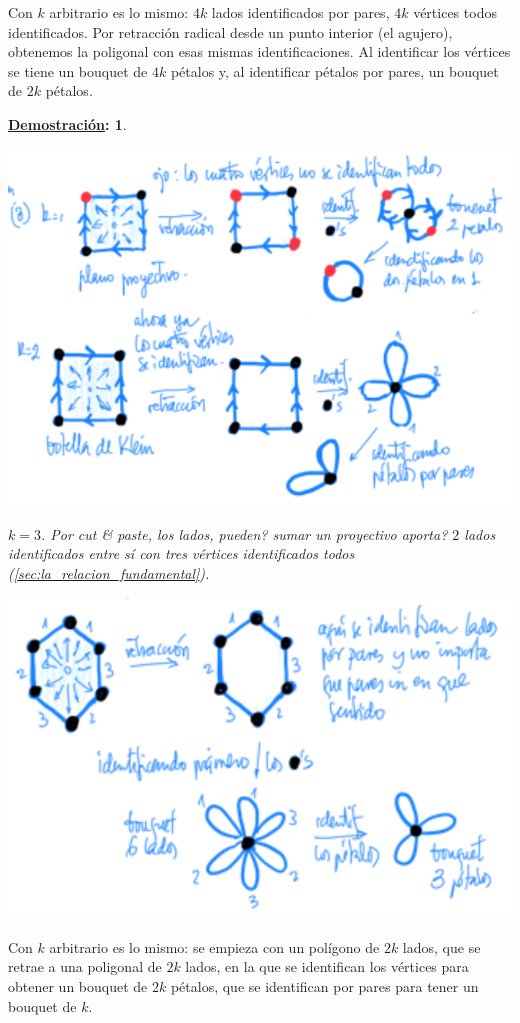 \documentclass[10pt,a4paper,openright]{book}
\theoremstyle{break}
\newtheorem*{demo}{\underline{Demostración}:}
\begin{document}
Con $k$ arbitrario es lo mismo: $4k$ lados identificados por pares, $4k$ vértices todos identificados. Por retracción radical desde un punto interior (el agujero), obtenemos la poligonal con esas mismas identificaciones. Al identificar los vértices se tiene un bouquet de $4k$ pétalos y, al identificar pétalos por pares, un bouquet de $2k$ pétalos.
\begin{demo}
\begin{center}
    \includegraphics[scale=0.3]{images/dem_grupo_fund_agujeros_2} 
\end{center}    
$k = 3$. Por \textit{cut \& paste}, los lados, pueden? sumar un proyectivo aporta? $2$ lados identificados entre sí con tres vértices identificados todos (\ref{sec:la_relacion_fundamental}).
\begin{center}
    \includegraphics[scale=0.3]{images/dem_grupo_fund_agujeros_3} 
\end{center}
\end{demo}
Con $k$ arbitrario es lo mismo: se empieza con un polígono de $2k$ lados, que se retrae a una poligonal de $2k$ lados, en la que se identifican los vértices para obtener un bouquet de $2k$ pétalos, que se identifican por pares para tener un bouquet de $k$.
\end{document}
